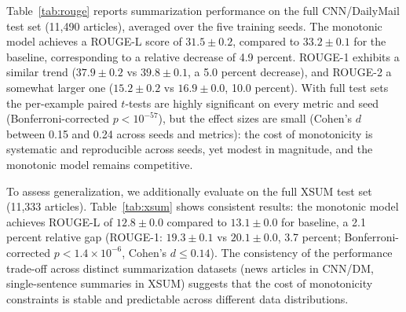 \documentclass{article}
\theoremstyle{plain}
\theoremstyle{definition}
\theoremstyle{remark}
\begin{document}
Table~\ref{tab:rouge} reports summarization performance on the full CNN/DailyMail test set (11{,}490 articles), averaged over the five training seeds. The monotonic model achieves a ROUGE-L score of $31.5 \pm 0.2$, compared to $33.2 \pm 0.1$ for the baseline, corresponding to a relative decrease of 4.9 percent. ROUGE-1 exhibits a similar trend ($37.9 \pm 0.2$ vs $39.8 \pm 0.1$, a 5.0 percent decrease), and ROUGE-2 a somewhat larger one ($15.2 \pm 0.2$ vs $16.9 \pm 0.0$, 10.0 percent). With full test sets the per-example paired $t$-tests are highly significant on every metric and seed (Bonferroni-corrected $p < 10^{-57}$), but the effect sizes are small (Cohen's $d$ between 0.15 and 0.24 across seeds and metrics): the cost of monotonicity is systematic and reproducible across seeds, yet modest in magnitude, and the monotonic model remains competitive.

To assess generalization, we additionally evaluate on the full XSUM test set (11{,}333 articles). Table~\ref{tab:xsum} shows consistent results: the monotonic model achieves ROUGE-L of $12.8 \pm 0.0$ compared to $13.1 \pm 0.0$ for baseline, a 2.1 percent relative gap (ROUGE-1: $19.3 \pm 0.1$ vs $20.1 \pm 0.0$, 3.7 percent; Bonferroni-corrected $p < 1.4 \times 10^{-6}$, Cohen's $d \le 0.14$). The consistency of the performance trade-off across distinct summarization datasets (news articles in CNN/DM, single-sentence summaries in XSUM) suggests that the cost of monotonicity constraints is stable and predictable across different data distributions.

\begin{table}[t]
\caption{Summarization quality on the full CNN/DailyMail test set ($n = 11{,}490$). Values are ROUGE F$_1$ $\times 100$, mean $\pm$ s.d.\ over five training seeds; within-seed 95\% bootstrap confidence intervals are narrower than $\pm 0.25$ points. ROUGE-L is the summary-level variant. The standard model is not fine-tuned and is therefore identical across seeds.}
\label{tab:rouge}
\vskip 0.1in
\centering
{}
\vskip -0.1in
\end{table}
\end{document}
